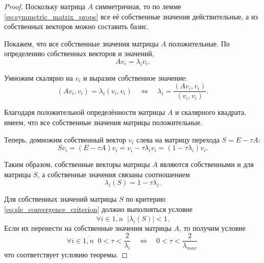 \documentclass{article}
\begin{document}
\begin{proof}
	Поскольку матрица $A$ симметричная, то по лемме
	\eqref{eq:symmetric_matrix_props} все её собственные значения
	действительные, а из собственных векторов можно составить базис.

	Покажем, что все собственные значения матрицы $A$ положительные.
	По определению собственных векторов и значений,
	\[Av_i=\lambda_iv_i.\]

	Умножим скалярно на $v_i$ и выразим собственное значение:
	\[(Av_i,v_i)=\lambda_i(v_i,v_i)\quad\Leftrightarrow\quad
	\lambda_i=\frac{(Av_i,v_i)}{(v_i,v_i)}.\]

	Благодаря положительной определённости матрицы $A$ и скалярного
	квадрата, имеем, что все собственные значения матрицы положительные.

	Теперь, домножим собственный вектор $v_i$ слева на матрицу перехода
	$S=E-\tau A$:
	\[Sv_i=(E-\tau A)v_i=v_i-\tau\lambda_i v_i=(1-\tau\lambda_i)v_i.\]

	Таким образом, собственные векторы матрицы $A$ являются собственными и
	для матрицы $S$, а собственные значения связаны соотношением
	\[\lambda_i(S)=1-\tau\lambda_i.\]

	Для собственных значений матрицы $S$ по критерию
	\eqref{eq:sle_convergence_criterion} должно выполняться условие
	\[\forall i\in\overline{1,n}\;\;|\lambda_i(S)|<1.\]
	Если их перенести на собственные значения матрицы $A$, то получим
	условие
	\[\forall i\in\overline{1,n}\;\;0<\tau<\frac{2}{\lambda_i}\quad
	\Leftrightarrow\quad 0<\tau<\frac{2}{\lambda_{max}}\,\]
	что соответствует условию теоремы.
\end{proof}
\end{document}
